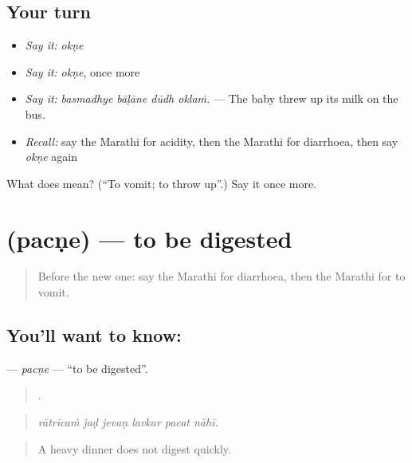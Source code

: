 \subsection*{Your turn}
\begin{itemize}
\raggedright
  \item \emph{Say it:} \emph{okṇe}
  \item \emph{Say it:} \emph{okṇe}, once more
  \item \emph{Say it:} \emph{basmadhye bāḷāne dūdh oklaṁ.} — The baby threw up its milk on the bus.
  \item \emph{Recall:} say the Marathi for acidity, then the Marathi for diarrhoea, then say \emph{okṇe} again
\end{itemize}

\begin{tcolorbox}[breakable,colback=teal!4,colframe=teal!35!black,title={Before you move on}]
What does  mean? (\textquotedblleft{}To vomit; to throw up\textquotedblright{}.) Say it once more.
\end{tcolorbox}
\section[\texorpdfstring{\mr{पचणे} (pacṇe)}{पचणे (pacṇe)}]{ (pacṇe) — to be digested}

\label{lesson:MR-C483-pacne}



\begin{quote}
Before the new one: say the Marathi for diarrhoea, then the Marathi for to vomit.
\end{quote}

\subsection*{You'll want to know: }
\textbf{} — \emph{pacṇe} — \textquotedblleft{}to be digested\textquotedblright{}.

\begin{quote}
     .
\end{quote}

\begin{quote}
\emph{rātrīcaṁ jaḍ jevaṇ lavkar pacat nāhī.}
\end{quote}

\begin{quote}
A heavy dinner does not digest quickly.
\end{quote}

